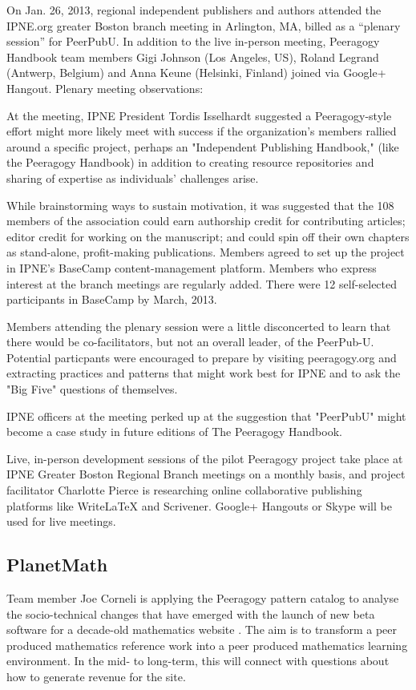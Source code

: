 \documentclass{acm_proc_article-sp}
\begin{document}
On Jan. 26, 2013, regional independent publishers and authors attended
the IPNE.org greater Boston branch meeting in Arlington, MA, billed as
a ``plenary session'' for PeerPubU. In addition to the live in-person
meeting, Peeragogy Handbook team members Gigi Johnson (Los Angeles,
US), Roland Legrand (Antwerp, Belgium) and Anna Keune (Helsinki,
Finland) joined via Google+ Hangout.  Plenary meeting observations:

At the meeting, IPNE President Tordis Isselhardt suggested a Peeragogy-style effort might more likely meet with success if the organization's members rallied around a specific project, perhaps an "Independent Publishing Handbook," (like the Peeragogy Handbook) in addition to creating resource repositories and sharing of expertise as individuals' challenges arise.

While brainstorming ways to sustain motivation, it was suggested that the 108 members of the association could earn authorship credit for contributing articles; editor credit for working on the manuscript; and could spin off their own chapters as stand-alone, profit-making publications. Members agreed to set up the project in IPNE's BaseCamp content-management platform. Members who express interest at the branch meetings are regularly added. There were 12 self-selected participants in BaseCamp by March, 2013.

Members attending the plenary session were a little disconcerted to learn that there would be co-facilitators, but not an overall leader, of the PeerPub-U. Potential particpants were encouraged to prepare by visiting peeragogy.org and
extracting practices and patterns that might work best for IPNE and to ask the "Big Five" questions of themselves.

IPNE officers at the meeting perked up at the suggestion that "PeerPubU" might become a case study in future editions of The Peeragogy Handbook.

Live, in-person development sessions of the pilot Peeragogy project take place at IPNE Greater Boston Regional Branch meetings on a monthly basis, and project facilitator Charlotte Pierce is researching online collaborative publishing platforms like WriteLaTeX and Scrivener. Google+ Hangouts or Skype will be used for live meetings.

\subsection{PlanetMath}

Team member Joe Corneli is applying the Peeragogy pattern catalog to analyse the socio-technical changes that have emerged with the launch of new beta software for a decade-old mathematics website \cite{corneli-thesis}.  The aim is to transform a peer produced mathematics reference work into a peer produced mathematics learning environment.  In the mid- to long-term, this will connect with questions about how to generate revenue for the site.
\end{document}
